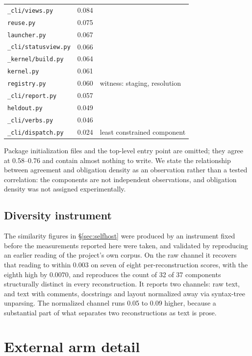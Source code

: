 \begin{center}
\begin{tabular}{@{}lll@{}}
\texttt{\_cli/views.py}        & 0.084 & \\
\texttt{reuse.py}              & 0.075 & \\
\texttt{launcher.py}           & 0.067 & \\
\texttt{\_cli/statusview.py}   & 0.066 & \\
\texttt{\_kernel/build.py}     & 0.064 & \\
\texttt{kernel.py}             & 0.061 & \\
\texttt{registry.py}           & 0.060 & witness: staging, resolution \\
\texttt{\_cli/report.py}       & 0.057 & \\
\texttt{heldout.py}            & 0.049 & \\
\texttt{\_cli/verbs.py}        & 0.046 & \\
\texttt{\_cli/dispatch.py}     & 0.024 & least constrained component \\
\bottomrule
\end{tabular}
\end{center}

Package initialization files and the top-level entry point are omitted;
they agree at 0.58--0.76 and contain almost nothing to write. We state
the relationship between agreement and obligation density as an
observation rather than a tested correlation: the components are not
independent observations, and obligation density was not assigned
experimentally.

\subsection{Diversity instrument}

The similarity figures in \S\ref{sec:selfhost} were produced by an
instrument fixed before the measurements reported here were taken, and
validated by reproducing an earlier reading of the project's own corpus.
On the raw channel it recovers that reading to within $0.003$ on seven of
eight per-reconstruction scores, with the eighth high by $0.0070$, and
reproduces the count of 32 of 37 components structurally distinct in
every reconstruction. It reports two channels: raw text, and text with
comments, docstrings and layout normalized away via syntax-tree
unparsing. The normalized channel runs 0.05 to 0.09 higher, because a
substantial part of what separates two reconstructions as text is prose.

\section{External arm detail}
\label{app:jq}

